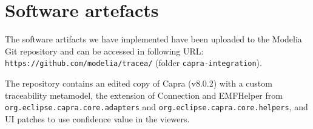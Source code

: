 \section{Software artefacts}\label{sec:artefacts}

The software artifacts we have implemented have been uploaded to the Modelia Git repository and can be accessed in following URL:
\verb|https://github.com/modelia/tracea/| (folder \texttt{capra-integration}).

The repository contains an edited copy of Capra ({v8.0.2}) with a custom traceability metamodel, the extension of Connection and EMFHelper from \verb|org.eclipse.capra.core.adapters| and \verb|org.eclipse.capra.core.helpers|, and UI patches to use confidence value in the viewers.

